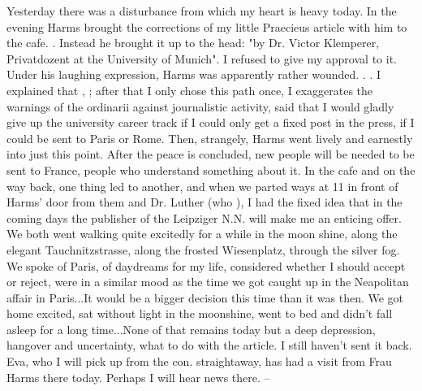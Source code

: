 
\missing

Yesterday there was a disturbance from which my heart is heavy today. In the evening Harms brought the corrections of my little Praecieus article with him to the cafe. . Instead he brought it up to the head: "by Dr. Victor Klemperer, Privatdozent at the University of Munich". I refused to give my approval to it. Under his laughing expression, Harms was apparently rather wounded. . . I explained that , ; after that I only chose this path once, I exaggerates the warnings of the ordinarii against journalistic activity, said that I would gladly give up the university career track if I could only get a fixed post in the press, if I could be sent to Paris or Rome. Then, strangely, Harms went lively and earnestly into just this point. After the peace is concluded, new people will be needed to be sent to France, people who understand something about it. In the cafe and on the way back, one thing led to another, and when we parted ways at 11 in front of Harms' door from them and Dr. Luther (who ), I had the fixed idea that in the coming days the publisher of the Leipziger N.N. will make me an enticing offer. We both went walking quite excitedly for a while in the moon shine, along the elegant Tauchnitzstrasse, along the frosted Wiesenplatz, through the silver fog. We spoke of Paris, of daydreams for my life, considered whether I should accept or reject, were in a similar mood as the time we got caught up in the Neapolitan affair in Paris...It would be a bigger decision this time than it was then. We got home excited, sat without light in the moonshine, went to bed and didn't fall asleep for a long time...None of that remains today but a deep depression, hangover and uncertainty, what to do with the article. I still haven't sent it back. Eva, who I will pick up from the con. straightaway, has had a visit from Frau Harms there today. Perhaps I will hear news there. --

